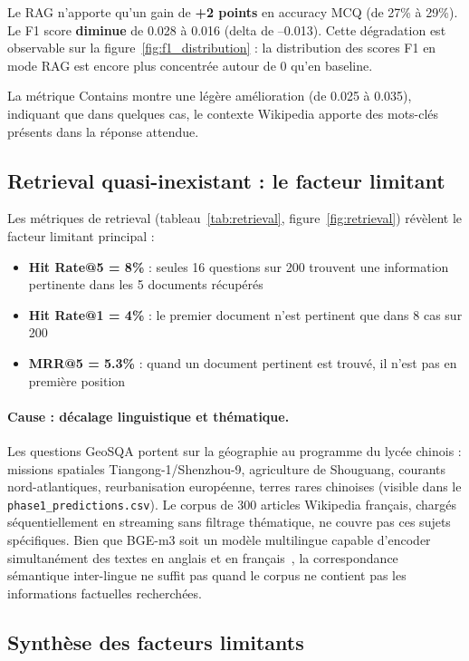\documentclass[12pt,a4paper]{article}
\begin{document}
Le RAG n'apporte qu'un gain de \textbf{+2 points} en accuracy MCQ (de 27\% à 29\%). Le F1 score \textbf{diminue} de 0.028 à 0.016 (delta de --0.013). Cette dégradation est observable sur la figure~\ref{fig:f1_distribution} : la distribution des scores F1 en mode RAG est encore plus concentrée autour de 0 qu'en baseline.

La métrique Contains montre une légère amélioration (de 0.025 à 0.035), indiquant que dans quelques cas, le contexte Wikipedia apporte des mots-clés présents dans la réponse attendue.

\subsection{Retrieval quasi-inexistant : le facteur limitant}

Les métriques de retrieval (tableau~\ref{tab:retrieval}, figure~\ref{fig:retrieval}) révèlent le facteur limitant principal :

\begin{itemize}[leftmargin=*]
  \item \textbf{Hit Rate@5 = 8\%} : seules 16 questions sur 200 trouvent une information pertinente dans les 5 documents récupérés
  \item \textbf{Hit Rate@1 = 4\%} : le premier document n'est pertinent que dans 8 cas sur 200
  \item \textbf{MRR@5 = 5.3\%} : quand un document pertinent est trouvé, il n'est pas en première position
\end{itemize}

\paragraph{Cause : décalage linguistique et thématique.}
Les questions GeoSQA portent sur la géographie au programme du lycée chinois : missions spatiales Tiangong-1/Shenzhou-9, agriculture de Shouguang, courants nord-atlantiques, reurbanisation européenne, terres rares chinoises (visible dans le \texttt{phase1\_predictions.csv}). Le corpus de 300 articles Wikipedia français, chargés séquentiellement en streaming sans filtrage thématique, ne couvre pas ces sujets spécifiques. Bien que BGE-m3 soit un modèle multilingue capable d'encoder simultanément des textes en anglais et en français~\cite{chen2024bgem3}, la correspondance sémantique inter-lingue ne suffit pas quand le corpus ne contient pas les informations factuelles recherchées.

\subsection{Synthèse des facteurs limitants}
\end{document}
